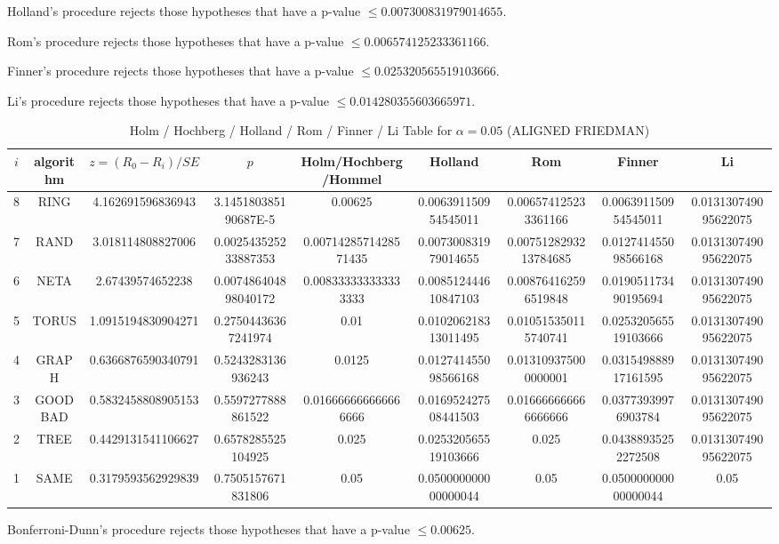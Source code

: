 \documentclass[a4paper,10pt]{article}
\begin{document}
\begin{landscape}
Holland's procedure rejects those hypotheses that have a p-value $\le0.007300831979014655$.


Rom's procedure rejects those hypotheses that have a p-value $\le0.006574125233361166$.


Finner's procedure rejects those hypotheses that have a p-value $\le0.025320565519103666$.


Li's procedure rejects those hypotheses that have a p-value $\le0.014280355603665971$.



\newpage

\begin{table}[!htp]
\centering\scriptsize
\caption{Holm / Hochberg / Holland / Rom / Finner / Li Table for $\alpha=0.05$ (ALIGNED FRIEDMAN)}
\begin{tabular}{ccccccccc}
$i$&algorithm&$z=(R_0 - R_i)/SE$&$p$&Holm/Hochberg/Hommel&Holland&Rom&Finner&Li\\
\hline
8& RING&4.162691596836943&3.145180385190687E-5&0.00625&0.006391150954545011&0.006574125233361166&0.006391150954545011&0.013130749095622075\\
7& RAND&3.018114808827006&0.002543525233887353&0.0071428571428571435&0.007300831979014655&0.0075128293213784685&0.012741455098566168&0.013130749095622075\\
6& NETA&2.67439574652238&0.007486404898040172&0.008333333333333333&0.008512444610847103&0.008764162596519848&0.019051173490195694&0.013130749095622075\\
5& TORUS&1.0915194830904271&0.27504436367241974&0.01&0.010206218313011495&0.010515350115740741&0.025320565519103666&0.013130749095622075\\
4& GRAPH&0.6366876590340791&0.5243283136936243&0.0125&0.012741455098566168&0.013109375000000001&0.031549888917161595&0.013130749095622075\\
3& GOODBAD&0.5832458808905153&0.5597277888861522&0.016666666666666666&0.016952427508441503&0.016666666666666666&0.03773939976903784&0.013130749095622075\\
2& TREE&0.4429131541106627&0.6578285525104925&0.025&0.025320565519103666&0.025&0.04388935252272508&0.013130749095622075\\
1& SAME&0.3179593562929839&0.7505157671831806&0.05&0.050000000000000044&0.05&0.050000000000000044&0.05\\
\hline
\end{tabular}
\end{table}
Bonferroni-Dunn's procedure rejects those hypotheses that have a p-value $\le0.00625$.



\end{landscape}
\end{document}
